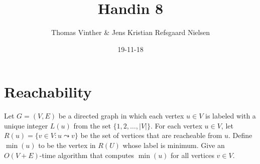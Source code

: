 \documentclass{article}
\theoremstyle{remark}
\numberwithin{equation}{section}
\begin{document}
	\author{Thomas Vinther \& Jens Kristian Refsgaard Nielsen}
	\title{Handin 8}
	\date{19-11-18}
	\maketitle
	\section{Reachability}
	
	Let $G=(V,E)$ be a directed graph in which each vertex $u \in V$ is labeled with a unique integer $L(u)$ from the set $\{1,2,\dots,|V| \}$. For each vertex $u \in V$, let $R(u)=\{v \in V : u \leadsto v \}$ be the set of vertices that are reacheable from $u$. Define $\min(u)$ to be the vertex in $R(U)$ whose label is minimum. Give an $O(V+E)$-time algorithm that computes $\min(u)$ for all vertices $v \in V$.\\

	
\end{document}

